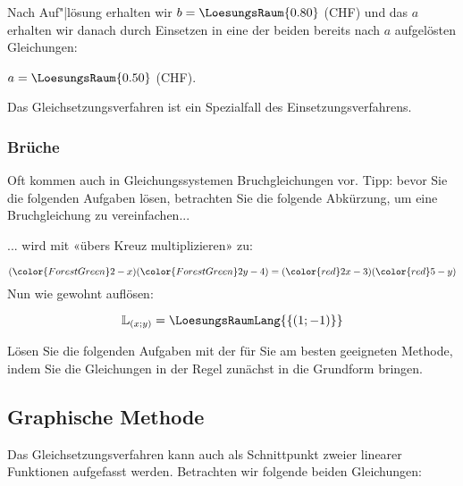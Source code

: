 Nach Auf"|lösung erhalten wir $b=\LoesungsRaum{0.80}$ (CHF) und das
$a$ erhalten wir danach durch Einsetzen in eine der beiden bereits
nach $a$ aufgelösten Gleichungen:


$a=\LoesungsRaum{0.50}$ (CHF).

Das Gleichsetzungsverfahren ist ein Spezialfall des
Einsetzungsverfahrens.
\newpage


\subsubsection{Brüche}
Oft kommen auch in Gleichungssystemen Bruchgleichungen vor. Tipp:
bevor Sie die folgenden Aufgaben lösen, betrachten Sie die folgende
Abkürzung, um eine Bruchgleichung zu vereinfachen...

... wird mit «übers Kreuz multiplizieren» zu:

$$({\color{ForestGreen}2-x})({\color{ForestGreen}2y-4}) =
({\color{red}2x-3})({\color{red}5-y})$$
Nun wie gewohnt auflösen:

$$\mathbb{L}_{(x;y)} = \LoesungsRaumLang{\{(1; -1)\}}$$

Lösen Sie die folgenden Aufgaben mit der für Sie am besten geeigneten Methode, indem Sie die
Gleichungen in der Regel zunächst in die Grundform bringen.

\newpage


\subsection{Graphische Methode}
Das Gleichsetzungsverfahren kann auch als Schnittpunkt zweier linearer Funktionen
aufgefasst werden. Betrachten wir folgende beiden Gleichungen:

